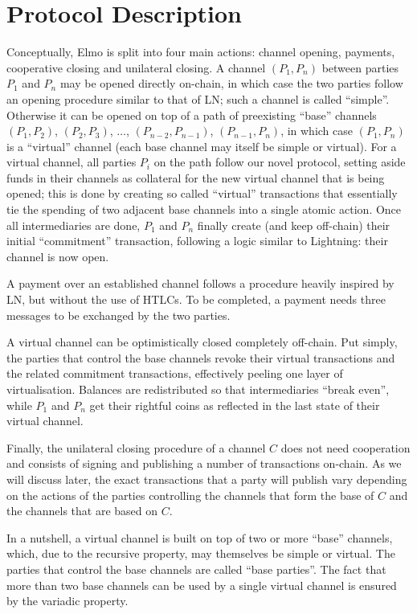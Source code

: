 \section{Protocol Description}
  Conceptually, Elmo is split into four main actions: channel opening,
  payments, cooperative closing and unilateral closing. A channel $(P_1, P_n)$
  between parties $P_1$ and $P_n$
  may be opened directly on-chain, in which case the two parties follow an
  opening procedure similar to that of LN; such a channel is called ``simple''.
  Otherwise it can be opened on top of a path
  of preexisting ``base'' channels $(P_1, P_2)$, $(P_2, P_3)$, $\dots$, $(P_{n-2},
  P_{n-1})$, $(P_{n-1}, P_{n})$, in which case $(P_1, P_n)$ is a ``virtual''
  channel (each base channel may itself be simple or virtual). For a virtual
  channel, all parties $P_i$ on the
  path follow our novel protocol, setting aside funds in their channels as
  collateral for the new virtual channel that is being opened; this is done
  by creating so called ``virtual'' transactions that essentially tie the
  spending of two adjacent base channels into a single atomic action. Once all
  intermediaries are done, $P_1$ and $P_n$ finally create (and keep
  off-chain) their initial ``commitment'' transaction, following a logic similar
  to Lightning: their channel is now open.

  A payment over an established channel follows a procedure heavily inspired by
  LN, but without the use of HTLCs. To be completed, a payment needs three
  messages to be exchanged by the two parties.

  A virtual channel can be optimistically closed completely off-chain. Put
  simply, the parties that control the base channels revoke their virtual
  transactions and the related commitment transactions, effectively peeling one
  layer of virtualisation. Balances are redistributed so that intermediaries
  ``break even'', while $P_1$ and $P_n$ get their rightful coins as reflected in
  the last state of their virtual channel.

  Finally, the unilateral closing procedure of a channel $C$ does not need
  cooperation and consists of signing and publishing a number of transactions
  on-chain. As
  we will discuss later, the exact transactions that a party will publish vary
  depending on the actions of the parties controlling the channels that form the
  base of $C$ and the channels that are based on $C$.

  In a nutshell, a virtual channel is built on top of two or more ``base''
  channels, which, due to the recursive property, may themselves be simple or
  virtual. The parties that control the base channels are called ``base
  parties''. The fact that more than two base channels can be used by a single
  virtual channel is ensured by the variadic property.

